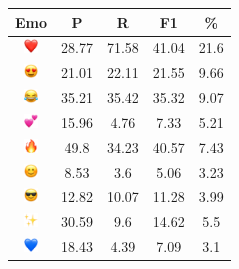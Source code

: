 \documentclass{article}
\begin{document}
\begin{table}
\centering
\begin{tabular}{|c|ccc|c|} \hline
\textbf{Emo} & \textbf{P} & \textbf{R} & \textbf{F1} & \textbf{\%} \\ \hline
\includegraphics[height=0.37cm,width=0.37cm]{img/red_heart.png} & 28.77 & 71.58 & 41.04 & 21.6\\ 
\includegraphics[height=0.37cm,width=0.37cm]{img/smiling_face_with_hearteyes.png} & 21.01 & 22.11 & 21.55 & 9.66\\ 
\includegraphics[height=0.37cm,width=0.37cm]{img/face_with_tears_of_joy.png} & 35.21 & 35.42 & 35.32 & 9.07\\ 
\includegraphics[height=0.37cm,width=0.37cm]{img/two_hearts.png} & 15.96 & 4.76 & 7.33 & 5.21\\ 
\includegraphics[height=0.37cm,width=0.37cm]{img/fire.png} & 49.8 & 34.23 & 40.57 & 7.43\\ 
\includegraphics[height=0.37cm,width=0.37cm]{img/smiling_face_with_smiling_eyes.png} & 8.53 & 3.6 & 5.06 & 3.23\\ 
\includegraphics[height=0.37cm,width=0.37cm]{img/smiling_face_with_sunglasses.png} & 12.82 & 10.07 & 11.28 & 3.99\\ 
\includegraphics[height=0.37cm,width=0.37cm]{img/sparkles.png} & 30.59 & 9.6 & 14.62 & 5.5\\ 
\includegraphics[height=0.37cm,width=0.37cm]{img/blue_heart.png} & 18.43 & 4.39 & 7.09 & 3.1\\ 

\end{tabular}
\end{table}
\end{document}
